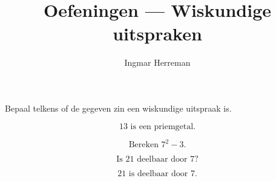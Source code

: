 \documentclass{ximera}
\title{Oefeningen --- Wiskundige uitspraken}
\author{Ingmar Herreman}
\begin{document}













\maketitle




\begin{oefening}{\oefB \ESS}

Bepaal telkens of de gegeven zin een wiskundige uitspraak is.

\begin{question}
\[
13\text{ is een priemgetal.}
\]

\begin{multipleChoice}
\end{multipleChoice}
\end{question}


\begin{question}
\[
\text{Bereken }7^2-3.
\]

\begin{multipleChoice}
\end{multipleChoice}
\end{question}


\begin{question}
\[
\text{Is }21\text{ deelbaar door }7?
\]

\begin{multipleChoice}
\end{multipleChoice}
\end{question}


\begin{question}
\[
21\text{ is deelbaar door }7.
\]

\begin{multipleChoice}
\end{multipleChoice}
\end{question}



\end{oefening}
\end{document}
